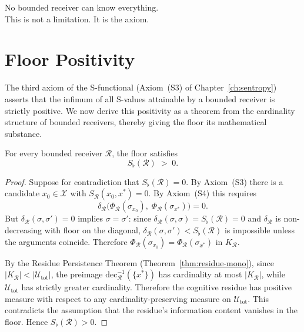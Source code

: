 
\epigraph{%
  No bounded receiver can know everything.\\
  This is not a limitation.  It is the axiom.%
}{}

\section{Floor Positivity}
\label{sec:ch14-floor}

The third axiom of the S-functional (Axiom~(S3) of Chapter~\ref{ch:sentropy})
asserts that the infimum of all S-values attainable by a bounded receiver is
strictly positive.  We now derive this positivity as a theorem from the
cardinality structure of bounded receivers, thereby giving the floor its
mathematical substance.

\begin{theorem}\label{thm:floor-pos-mono}
For every bounded receiver $\mathcal{R}$, the floor satisfies
\[
  S_{\flat}(\mathcal{R}) \;>\; 0.
\]
\end{theorem}

\begin{proof}
Suppose for contradiction that $S_{\flat}(\mathcal{R}) = 0$.  By Axiom~(S3)
there is a candidate $x_0 \in \mathcal{X}$ with
$S_{\mathcal{R}}(x_0, x^{*}) = 0$.  By Axiom~(S4) this requires
\[
  \delta_{\mathcal{R}}\!\bigl(\Phi_{\mathcal{R}}(\sigma_{x_0}),\;
  \Phi_{\mathcal{R}}(\sigma_{x^{*}})\bigr) = 0.
\]
But $\delta_{\mathcal{R}}(\sigma, \sigma') = 0$ implies $\sigma = \sigma'$:
since $\delta_{\mathcal{R}}(\sigma, \sigma) = S_{\flat}(\mathcal{R}) = 0$
and $\delta_{\mathcal{R}}$ is non-decreasing with floor on the diagonal,
$\delta_{\mathcal{R}}(\sigma, \sigma') < S_{\flat}(\mathcal{R})$ is impossible
unless the arguments coincide.  Therefore
$\Phi_{\mathcal{R}}(\sigma_{x_0}) = \Phi_{\mathcal{R}}(\sigma_{x^{*}})$
in $K_{\mathcal{R}}$.

By the Residue Persistence Theorem (Theorem~\ref{thm:residue-mono}), since
$|K_{\mathcal{R}}| < |\mathcal{U}_{\mathrm{tot}}|$, the preimage
$\mathrm{dec}_{\mathcal{R}}^{-1}(\{x^{*}\})$ has cardinality at most
$|K_{\mathcal{R}}|$, while $\mathcal{U}_{\mathrm{tot}}$ has strictly greater
cardinality.  Therefore the cognitive residue has positive measure with respect
to any cardinality-preserving measure on $\mathcal{U}_{\mathrm{tot}}$.  This
contradicts the assumption that the residue's information content vanishes in
the floor.  Hence $S_{\flat}(\mathcal{R}) > 0$.
\end{proof}

